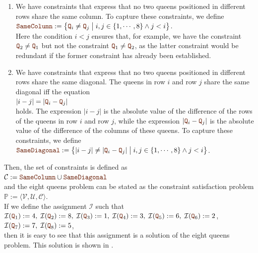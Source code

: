 \begin{enumerate}
\item We have constraints that express that no two queens positioned in different rows share the same column.
      To capture these constraints, we define
      \\[0.2cm]
      \hspace*{1.3cm}
      $\mytt{SameColumn} := \bigl\{ \mytt{Q}_i \not= \mytt{Q}_j \bigm| i,j \in \{1,\cdots,8\} \wedge j < i \bigr\}$.
      \\[0.2cm]
      Here the condition $i < j$ ensures that, for example, we have the constraint $\mytt{Q}_2 \not= \mytt{Q}_1$
      but not the constraint  $\mytt{Q}_1 \not= \mytt{Q}_2$, as the latter constraint would be redundant if
      the former constraint has already been established.
\item We have constraints that express that no two queens positioned in different rows share the same 
      diagonal.  The queens in row $i$ and row $j$ share the same diagonal iff the equation
      \\[0.2cm]
      \hspace*{1.3cm}
      $|i - j| = |\mytt{Q}_i - \mytt{Q}_j|$
      \\[0.2cm]
      holds.  The expression $|i-j|$ is the absolute value of the difference of the rows of the queens in row
      $i$ and row $j$,  while the expression $|\mytt{Q}_i - \mytt{Q}_j|$ is the absolute value of the difference of the
      columns of these queens.  To capture these constraints, we define
      \\[0.2cm]
      \hspace*{1.3cm}
      $\mytt{SameDiagonal} := \bigl\{ |i  - j| \not= |\mytt{Q}_i - \mytt{Q}_j| \bigm| i,j \in \{1,\cdots,8\} \wedge j < i \bigr\}$.
\end{enumerate}
Then, the set of constraints is defined as 
\\[0.2cm]
\hspace*{1.3cm}
$\mathcal{C} := \mytt{SameColumn} \cup \mytt{SameDiagonal}$
\\[0.2cm]
and the eight queens problem can be stated as the constraint satisfaction problem
\\[0.2cm]
\hspace*{1.3cm}
$\mathbb{P} := \langle \mathcal{V}, \mathcal{U}, \mathcal{C} \rangle$.
\\[0.2cm]
If we define the assignment $\mathcal{I}$ such that
\\[0.2cm]
\hspace*{1.3cm}
$\mathcal{I}(\mytt{Q}_1) := 4,\; \mathcal{I}(\mytt{Q}_2) := 8,\; \mathcal{I}(\mytt{Q}_3) := 1,\;
\mathcal{I}(\mytt{Q}_4) := 3,\; \mathcal{I}(\mytt{Q}_5) := 6,\; \mathcal{I}(\mytt{Q}_6) := 2$,
\\[0.2cm]
\hspace*{1.3cm}
$\mathcal{I}(\mytt{Q}_7) := 7,\; \mathcal{I}(\mytt{Q}_8) := 5$,
\\[0.2cm]
then it is easy to see that this assignment is a solution of the eight queens problem.  This solution is shown
in .



